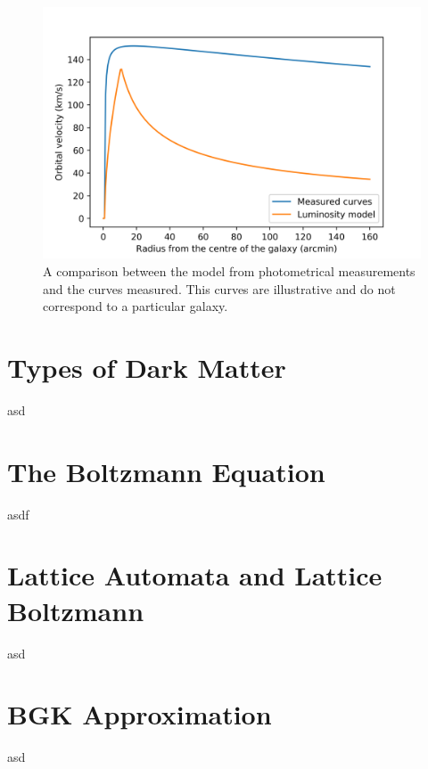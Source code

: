 \begin{figure}[H]
    \centering
    \includegraphics[scale=0.8]{imag/galaxyRotCurv.png}
    \caption{A comparison between the model from photometrical measurements and the curves measured. This curves are illustrative and do not correspond to a particular galaxy.}
    \label{galaxyCurve}
\end{figure}





\section{Types of Dark Matter}
asd
\section{The Boltzmann Equation}
asdf
\section{Lattice Automata and Lattice Boltzmann}
asd
\section{BGK Approximation}
asd
